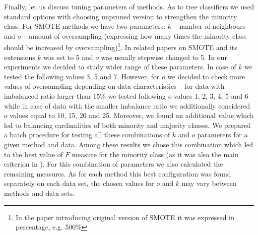 \documentclass[conference]{IEEEtran}
\begin{document}
Finally, let us discuss tuning parameters of methods. As to tree classifiers we used standard options with choosing unpruned version to strengthen the minority class. For SMOTE methods we have two parameters: $k$ -- number of neighbours and $o$ -- amount of oversampling (expressing how many times the minority class should be increased by oversampling)\footnote{In the paper introducing original version of SMOTE \cite{Chawla} it was expressed in percentage, e.g. 500\%}.  In related papers on SMOTE and its extensions $k$ was set to 5 and $o$ was usually stepwise changed to 5. In our experiments we decided to study wider range of these parameters. In case of $k$ we tested the following values 3, 5 and 7. However, for $o$ we decided to check more values of oversampling depending on data characteristics -- for data with imbalanced ratio larger than 15\% we tested following $o$ values 1, 2, 3, 4, 5 and 6 while in case of data with the smaller imbalance ratio we additionally considered $o$ values  equal to 10, 15, 20 and 25. Moreover, we found an additional value which led to balancing cardinalities of both minority and majority classes. We prepared a  batch procedure for testing all these combinations of $k$ and $o$ parameters for a given method and data. Among these results we chose this combination  which led to the best value of $F$ measure for the minority class  (as it was also the main criterion in \cite{Safe,Borderline}). For this combination of parameters we also calculated the remaining measures.  As for each method this best configuration was found separately on each data set,  the chosen values for $o$ and $k$ may vary between methods and data sets.
\end{document}

